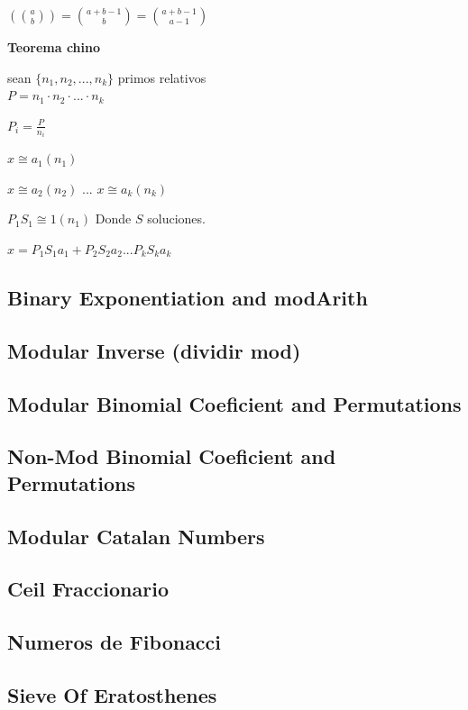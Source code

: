 $\left(\binom{a}{b}\right) = \binom{a+b-1}{b} = \binom{a+b-1}{a-1}$

\textbf{Teorema chino}

sean $\{n_{1}, n_{2},..., n_{k} \}$ primos relativos\\

$P = n_{1}\cdot n_{2}\cdot ...\cdot n_{k}$

$P_{i} = \frac{P}{n_{i}}$

$x\cong a_{1}(n_{1})$

$x\cong a_{2}(n_{2})$
$...$
$x\cong a_{k}(n_{k})$

$P_{1}S_{1} \cong 1(n_{1})$ Donde $S$ soluciones.

$x = P_{1}S_{1}a_{1} + P_{2}S_{2}a_{2} ... P_{k}S_{k}a_{k}$


\subsection{Binary Exponentiation and modArith}
\subsection{Modular Inverse (dividir mod)}
\subsection{Modular Binomial Coeficient and Permutations}
\subsection{Non-Mod Binomial Coeficient and Permutations}
\subsection{Modular Catalan Numbers}
\subsection{Ceil Fraccionario}
\subsection{Numeros de Fibonacci}
\subsection{Sieve Of Eratosthenes}
